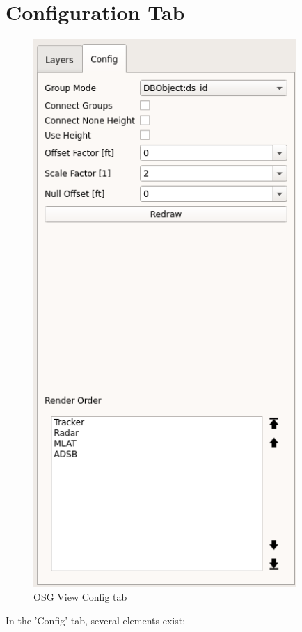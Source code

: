 \section{Configuration Tab}
\label{sec:osgview_config}

\begin{figure}[H]
    \hspace*{-2cm}
    \includegraphics[width=10cm,frame]{../screenshots/osgview_config_tab.png}
  \caption{OSG View Config tab}
\end{figure}


In the 'Config' tab, several elements exist:


